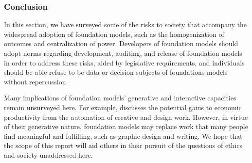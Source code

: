 \subsubsection{Conclusion} In this section, we have surveyed some of the risks to society that accompany the widespread adoption of foundation models, such as the homogenization of outcomes and centralization of power. Developers of foundation models should adopt norms regarding development, auditing, and release of foundation models in order to address these risks, aided by legislative requirements, and individuals should be able refuse to be data or decision subjects of foundations models without repercussion.

Many implications of foundation models' generative and interactive capacities remain unsurveyed here.  
For example,  discusses the potential gains to economic productivity from the automation of creative and design work.  
However, in virtue of their generative nature, foundation models may replace work that many people find meaningful and fulfilling, such as graphic design and writing. 
We hope that the scope of this report will aid others in their pursuit of the questions of ethics and society unaddressed here. 